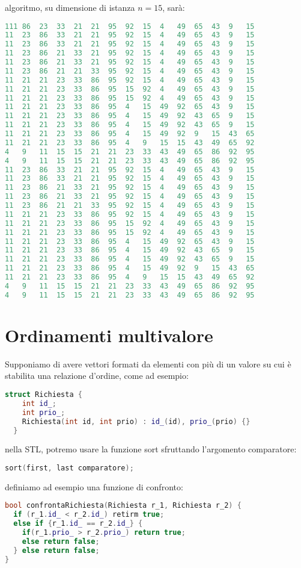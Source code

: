 \documentclass[a4paper,12pt]{article}
\begin{document}
algoritmo, su dimensione di istanza $n=15$, sarà:
\begin{lstlisting}[language=C++]
111	86	23	33	21	21	95	92	15	4	49	65	43	9	15	
11	23	86	33	21	21	95	92	15	4	49	65	43	9	15	
11	23	86	33	21	21	95	92	15	4	49	65	43	9	15	
11	23	86	21	33	21	95	92	15	4	49	65	43	9	15	
11	23	86	21	33	21	95	92	15	4	49	65	43	9	15	
11	23	86	21	21	33	95	92	15	4	49	65	43	9	15	
11	21	21	23	33	86	95	92	15	4	49	65	43	9	15	
11	21	21	23	33	86	95	15	92	4	49	65	43	9	15	
11	21	21	23	33	86	95	15	92	4	49	65	43	9	15	
11	21	21	23	33	86	95	4	15	49	92	65	43	9	15	
11	21	21	23	33	86	95	4	15	49	92	43	65	9	15	
11	21	21	23	33	86	95	4	15	49	92	43	65	9	15	
11	21	21	23	33	86	95	4	15	49	92	9	15	43	65	
11	21	21	23	33	86	95	4	9	15	15	43	49	65	92	
4	9	11	15	15	21	21	23	33	43	49	65	86	92	95	
4	9	11	15	15	21	21	23	33	43	49	65	86	92	95
11	23	86	33	21	21	95	92	15	4	49	65	43	9	15	
11	23	86	33	21	21	95	92	15	4	49	65	43	9	15	
11	23	86	21	33	21	95	92	15	4	49	65	43	9	15	
11	23	86	21	33	21	95	92	15	4	49	65	43	9	15	
11	23	86	21	21	33	95	92	15	4	49	65	43	9	15	
11	21	21	23	33	86	95	92	15	4	49	65	43	9	15	
11	21	21	23	33	86	95	15	92	4	49	65	43	9	15	
11	21	21	23	33	86	95	15	92	4	49	65	43	9	15	
11	21	21	23	33	86	95	4	15	49	92	65	43	9	15	
11	21	21	23	33	86	95	4	15	49	92	43	65	9	15	
11	21	21	23	33	86	95	4	15	49	92	43	65	9	15	
11	21	21	23	33	86	95	4	15	49	92	9	15	43	65	
11	21	21	23	33	86	95	4	9	15	15	43	49	65	92	
4	9	11	15	15	21	21	23	33	43	49	65	86	92	95	
4	9	11	15	15	21	21	23	33	43	49	65	86	92	95
\end{lstlisting}
\section{Ordinamenti multivalore}
Supponiamo di avere vettori formati da elementi con più di un valore su cui è stabilita una relazione d'ordine,
come ad esempio:
\begin{lstlisting}[language=C++]
  struct Richiesta {
    int id_;
    int prio_;
    Richiesta(int id, int prio) : id_(id), prio_(prio) {}
  }
\end{lstlisting}

nella STL, potremo usare la funzione sort sfruttando l'argomento comparatore:
\begin{lstlisting}[language=C++]
sort(first, last comparatore);
\end{lstlisting}

definiamo ad esempio una funzione di confronto:
\begin{lstlisting}[language=C++]
bool confrontaRichiesta(Richiesta r_1, Richiesta r_2) {
  if (r_1.id_ < r_2.id_) retirm true;
  else if {r_1.id_ == r_2.id_} {
    if(r_1.prio_ > r_2.prio_) return true;
    else return false;
  } else return false;
}
\end{lstlisting}
\end{document}
